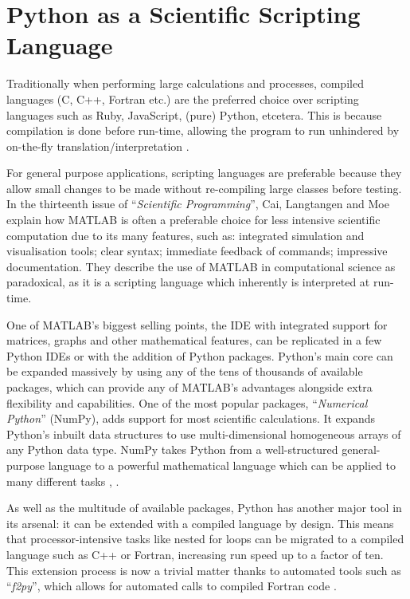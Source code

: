 \documentclass{report}
\newcommand{\propernoun}[1]{\enquote{\textit{#1}}}
\begin{document}
    
    \section{Python as a Scientific Scripting Language}
    Traditionally when performing large calculations and processes, compiled languages (C, C++, Fortran etc.) are the preferred choice over scripting languages such as Ruby, JavaScript, (pure) Python, etcetera. This is because compilation is done before run-time, allowing the program to run unhindered by on-the-fly translation/interpretation \cite{Cai2005}.
    
    For general purpose applications, scripting languages are preferable because they allow small changes to be made without re-compiling large classes before testing. In the thirteenth issue of \propernoun{Scientific Programming}, Cai, Langtangen and Moe \cite{Cai2005} explain how MATLAB is often a preferable choice for less intensive scientific computation due to its many features, such as: integrated simulation and visualisation tools; clear syntax; immediate feedback of commands; impressive documentation. They describe the use of MATLAB in computational science as paradoxical, as it is a scripting language which inherently is interpreted at run-time.
    
    One of MATLAB's biggest selling points, the IDE with integrated support for matrices, graphs and other mathematical features, can be replicated in a few Python IDEs or with the addition of Python packages. Python's main core can be expanded massively by using any of the tens of thousands of available packages, which can provide any of MATLAB's advantages alongside extra flexibility and capabilities. One of the most popular packages, \propernoun{Numerical Python} (NumPy), adds support for most scientific calculations. It expands Python's inbuilt data structures to use multi-dimensional homogeneous arrays of any Python data type. NumPy takes Python from a well-structured general-purpose language to a powerful mathematical language which can be applied to many different tasks \cite{Cai2005}, \cite{Oliphant2006}.
    
    As well as the multitude of available packages, Python has another major tool in its arsenal: it can be extended with a compiled language by design. This means that processor-intensive tasks like nested for loops can be migrated to a compiled language such as C++ or Fortran, increasing run speed up to a factor of ten. This extension process is now a trivial matter thanks to automated tools such as \propernoun{f2py}, which allows for automated calls to compiled Fortran code \cite{Oliphant2006}.
    
\end{document}
